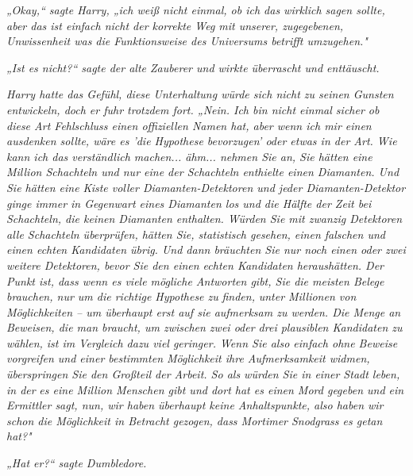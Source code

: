 {\emph{„Okay,“ sagte Harry, „ich weiß nicht einmal, ob ich das wirklich sagen sollte, aber das ist einfach nicht der korrekte Weg mit unserer, zugegebenen, Unwissenheit was die Funktionsweise des Universums betrifft umzugehen."}

\emph{„Ist es nicht?“ sagte der alte Zauberer und wirkte überrascht und enttäuscht.}

\emph{Harry hatte das Gefühl, diese Unterhaltung würde sich nicht zu seinen Gunsten entwickeln, doch er fuhr trotzdem fort. „Nein. Ich bin nicht einmal sicher ob diese Art Fehlschluss einen offiziellen Namen hat, aber wenn ich mir einen ausdenken sollte, wäre es 'die Hypothese bevorzugen' oder etwas in der Art. Wie kann ich das verständlich machen... ähm... nehmen Sie an, Sie hätten eine Million Schachteln und nur eine der Schachteln enthielte einen Diamanten. Und Sie hätten eine Kiste voller Diamanten-Detektoren und jeder Diamanten-Detektor ginge immer in Gegenwart eines Diamanten los und die Hälfte der Zeit bei Schachteln, die keinen Diamanten enthalten. Würden Sie mit zwanzig Detektoren alle Schachteln überprüfen, hätten Sie, statistisch gesehen, einen falschen und einen echten Kandidaten übrig. Und dann bräuchten Sie nur noch einen oder zwei weitere Detektoren, bevor Sie den einen echten Kandidaten heraushätten. Der Punkt ist, dass wenn es viele mögliche Antworten gibt, Sie die meisten Belege brauchen, nur um die richtige Hypothese zu} \emph{\emph{finden,}} \emph{unter Millionen von Möglichkeiten -- um überhaupt erst auf sie aufmerksam zu werden. Die Menge an Beweisen, die man braucht, um zwischen zwei oder drei plausiblen Kandidaten zu wählen, ist im Vergleich dazu viel geringer. Wenn Sie also einfach ohne Beweise vorgreifen und einer bestimmten Möglichkeit ihre Aufmerksamkeit widmen, überspringen Sie den Großteil der Arbeit. So als würden Sie in einer Stadt leben, in der} \emph{es eine Million Menschen gibt und dort hat es einen Mord gegeben und ein Ermittler sagt, nun, wir haben überhaupt keine Anhaltspunkte, also haben wir schon die Möglichkeit in Betracht gezogen, dass Mortimer Snodgrass es getan hat?"}

\emph{„Hat er?“ sagte Dumbledore.}

}
